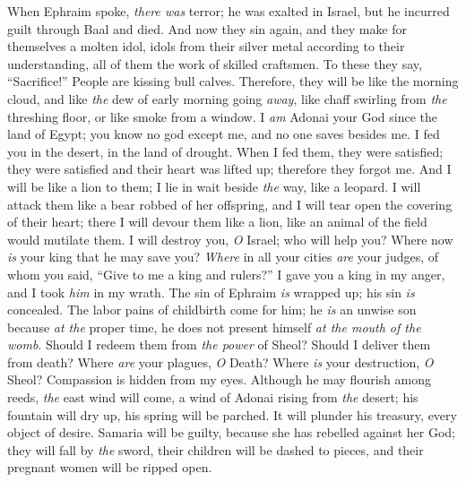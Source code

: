 \begin{biblechapter} %
 When Ephraim spoke, \textit{there was} terror; 
he was exalted in Israel, 
but he incurred guilt through Baal and died.
\verse And now they sin again, 
and they make for themselves a molten idol, 
idols from their silver metal according to their understanding, 
all of them the work of skilled craftsmen. 
To these they say, “Sacrifice!” 
People are kissing bull calves.
\verse Therefore, they will be like the morning cloud, 
and like \textit{the} dew of early morning going \textit{away}, 
like chaff swirling from \textit{the} threshing floor, 
or like smoke from a window.
\verse I \textit{am} Adonai your God 
since the land of Egypt; 
you know no god except me, 
and no one saves besides me.
\verse I fed you in the desert, 
in the land of drought.
\verse When I fed them, they were satisfied; 
they were satisfied and their heart was lifted up; 
therefore they forgot me.
\verse And I will be like a lion to them; 
I lie in wait beside \textit{the} way, like a leopard.
\verse I will attack them like a bear robbed of her offspring, 
and I will tear open the covering of their heart; 
there I will devour them like a lion, 
like an animal of the field would mutilate them.
\verse I will destroy you, \textit{O} Israel; 
who will help you?
\verse Where now \textit{is} your king that he may save you? 
\textit{Where} in all your cities \textit{are} your judges, 
of whom you said, “Give to 
me a king and rulers?”
\verse I gave you a king in my anger, 
and I took \textit{him} in my wrath.
\verse The sin of Ephraim \textit{is} wrapped up; 
his sin \textit{is} concealed.
\verse The labor pains of childbirth come for him; 
he \textit{is} an unwise son 
because \textit{at the} proper time, he does not present himself 
\textit{at the mouth of the womb}.
\verse Should I redeem them from \textit{the power} of Sheol?  
Should I deliver them from death? 
Where \textit{are} your plagues, \textit{O} Death? 
Where \textit{is} your destruction, \textit{O} Sheol? 
Compassion is hidden from my eyes.
\verse Although he may flourish among reeds, 
\textit{the} east wind will come, a wind of Adonai 
rising from \textit{the} desert; 
his fountain will dry up, 
his spring will be parched. 
It will plunder his treasury, 
every object of desire.
\verse  Samaria will be guilty, 
because she has rebelled against her God; 
they will fall by \textit{the} sword, 
their children will be dashed to pieces, 
and their pregnant women will be ripped open.
\end{biblechapter}

